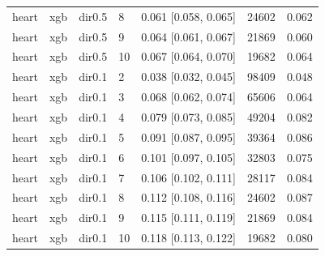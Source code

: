 \begin{tabular}{lllllll}
heart & xgb & dir0.5 & 8 & 0.061 [0.058, 0.065] & 24602 & 0.062 \\
heart & xgb & dir0.5 & 9 & 0.064 [0.061, 0.067] & 21869 & 0.060 \\
heart & xgb & dir0.5 & 10 & 0.067 [0.064, 0.070] & 19682 & 0.064 \\
heart & xgb & dir0.1 & 2 & 0.038 [0.032, 0.045] & 98409 & 0.048 \\
heart & xgb & dir0.1 & 3 & 0.068 [0.062, 0.074] & 65606 & 0.064 \\
heart & xgb & dir0.1 & 4 & 0.079 [0.073, 0.085] & 49204 & 0.082 \\
heart & xgb & dir0.1 & 5 & 0.091 [0.087, 0.095] & 39364 & 0.086 \\
heart & xgb & dir0.1 & 6 & 0.101 [0.097, 0.105] & 32803 & 0.075 \\
heart & xgb & dir0.1 & 7 & 0.106 [0.102, 0.111] & 28117 & 0.084 \\
heart & xgb & dir0.1 & 8 & 0.112 [0.108, 0.116] & 24602 & 0.087 \\
heart & xgb & dir0.1 & 9 & 0.115 [0.111, 0.119] & 21869 & 0.084 \\
heart & xgb & dir0.1 & 10 & 0.118 [0.113, 0.122] & 19682 & 0.080 \\
\bottomrule
\end{tabular}
